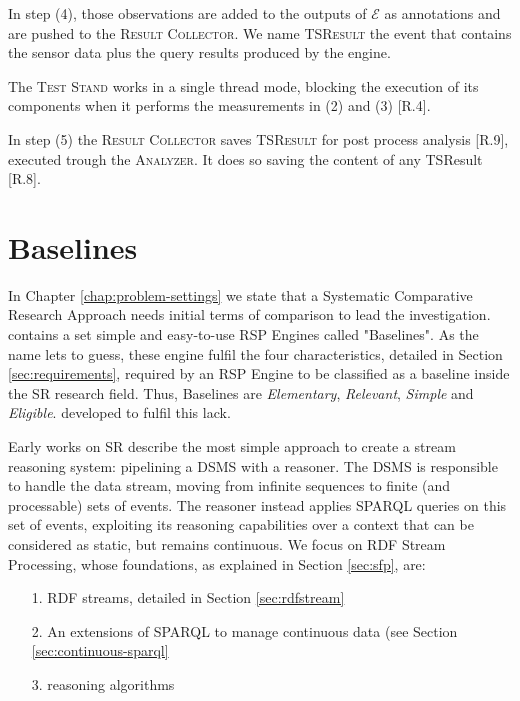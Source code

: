 In step (4), those observations are added to the outputs of $\mathcal{E}$ as annotations and are pushed to the \textsc{Result Collector}.  We name \textsc{TSResult} the event that contains the sensor data plus the query results produced by the engine.  

The \textsc{Test Stand} works in a single thread mode, blocking the execution of its components when it performs the measurements in (2) and (3) [R.4].  

In step (5) the \textsc{Result Collector} saves \textsc{TSResult} for post process analysis [R.9], executed trough the \textsc{Analyzer}. It does so saving the content of any TSResult  [R.8].

\section{Baselines}\label{sec:baselines}

\noindent In Chapter \ref{chap:problem-settings} we state that a Systematic Comparative Research Approach needs initial terms of comparison to lead the investigation. \name contains a set simple and easy-to-use RSP Engines called "Baselines". As the name lets to guess, these engine fulfil the four characteristics, detailed in Section \ref{sec:requirements}, required by an RSP Engine to be classified as a baseline inside the SR research field. Thus, \name Baselines are \textit{Elementary}, \textit{Relevant}, \textit{Simple} and \textit{Eligible}. developed to fulfil this lack. 

Early works on SR \cite{DBLP:conf/fis/ValleCBBC08,Walavalkar08streamingknowledge} describe the most simple approach to create a stream reasoning system: pipelining a DSMS with a reasoner. The DSMS is responsible to handle the data stream, moving from infinite sequences to finite (and processable) sets of events. The reasoner instead applies SPARQL queries on this set of events, exploiting its reasoning capabilities over a context that can be considered as static, but remains continuous. We focus on RDF Stream Processing, whose foundations, as explained in Section \ref{sec:sfp}, are: 
\begin{enumerate}
\item[1.] RDF streams, detailed in Section \ref{sec:rdfstream}
\item[2.] An extensions of SPARQL to manage continuous data (see Section \ref{sec:continuous-sparql}
\item[3.] reasoning algorithms
\end{enumerate}

